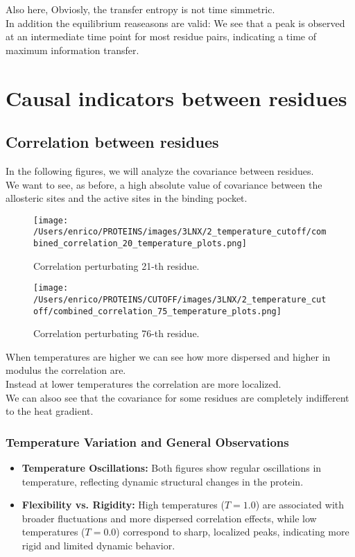 \documentclass[English, Lau, oneside]{sapthesis}
\begin{document}
\noindent Also here, Obviosly, the transfer entropy is not time simmetric.\\
In addition the equilibrium reaseasons are valid: We see that a peak is observed at an intermediate time point for
most residue pairs, indicating a time of maximum information transfer.

\newpage
\section{Causal indicators between residues}
\newpage
\subsection{Correlation between residues}
\noindent 
In the following figures, we will analyze the covariance between residues.\\
We want to see, as before, a high absolute value of covariance between the allosteric sites and the active sites in the binding pocket.\\

\begin{figure}[h!]
    \centering
    \texttt{[image: /Users/enrico/PROTEINS/images/3LNX/2\_temperature\_cutoff/combined\_correlation\_20\_temperature\_plots.png]}
    \caption{Correlation perturbating 21-th residue.}
    \label{fig:corr21_out}
\end{figure}
\begin{figure}[h!]
    \centering
    \texttt{[image: /Users/enrico/PROTEINS/CUTOFF/images/3LNX/2\_temperature\_cutoff/combined\_correlation\_75\_temperature\_plots.png]}
    \caption{Correlation perturbating 76-th residue.}
    \label{fig:corr76_out}
\end{figure}
When temperatures are higher we can see how more dispersed and higher in modulus the correlation are.\\
Instead at lower temperatures the correlation are more localized.\\
We can alsoo see that the covariance for some residues are completely indifferent to the heat gradient.\\ 

\subsubsection{Temperature Variation and General Observations}
\begin{itemize}
    \item \textbf{Temperature Oscillations:} Both figures show regular oscillations in temperature, reflecting dynamic structural changes in the protein.
    \item \textbf{Flexibility vs. Rigidity:} High temperatures (\( T = 1.0 \)) are associated with broader fluctuations and more dispersed correlation effects, while low temperatures (\( T = 0.0 \)) correspond to sharp, localized peaks, indicating more rigid and limited dynamic behavior.
\end{itemize}
\end{document}
